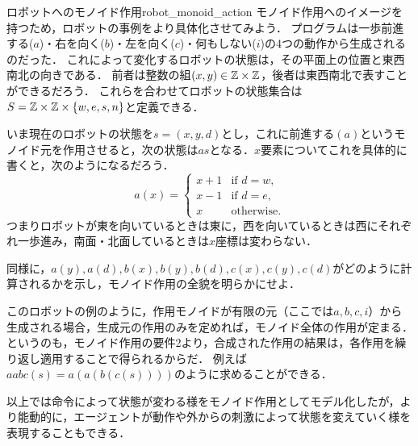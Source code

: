 \documentclass[11pt,a4paper, dvipdfmx]{jsarticle}
\begin{document}
\begin{rei}{ロボットへのモノイド作用}{robot_monoid_action}
    モノイド作用へのイメージを持つため，ロボットの事例をより具体化させてみよう．
    プログラムは一歩前進する($a$)・右を向く($b$)・左を向く($c$)・何もしない($i$)の4つの動作から生成されるのだった．
    これによって変化するロボットの状態は，その平面上の位置と東西南北の向きである．
    前者は整数の組$(x, y) \in \mathbb{Z} \times \mathbb{Z}$，後者は東西南北で表すことができるだろう．
    これらを合わせてロボットの状態集合は$S = \mathbb{Z} \times \mathbb{Z} \times \{w, e, s, n\}$と定義できる．
    
    いま現在のロボットの状態を$s = (x, y, d)$とし，これに前進する$(a)$というモノイド元を作用させると，次の状態は$as$となる．$x$要素についてこれを具体的に書くと，次のようになるだろう．
    \[
    a(x) = \begin{cases}
        x + 1 & \text{if } d=w, \\
        x - 1 & \text{if } d=e, \\
        x & \text{otherwise}.
    \end{cases}
    \]
    つまりロボットが東を向いているときは東に，西を向いているときは西にそれぞれ一歩進み，南面・北面しているときは$x$座標は変わらない．
\end{rei}

\begin{renshu}{}{}
    同様に，$a(y), a(d), b(x), b(y), b(d), c(x), c(y), c(d)$がどのように計算されるかを示し，モノイド作用の全貌を明らかにせよ．
\end{renshu}

このロボットの例のように，作用モノイドが有限の元（ここでは$a, b, c, i$）から生成される場合，生成元の作用のみを定めれば，モノイド全体の作用が定まる．
というのも，モノイド作用の要件2より，合成された作用の結果は，各作用を繰り返し適用することで得られるからだ．
例えば$aabc(s) = a(a(b(c(s))))$のように求めることができる．


以上では命令によって状態が変わる様をモノイド作用としてモデル化したが，より能動的に，エージェントが動作や外からの刺激によって状態を変えていく様を表現することもできる．
\end{document}

